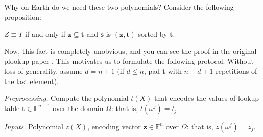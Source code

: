 Why on Earth do we need these two polynomials? Consider the following
proposition:

\begin{proposition}
    $Z \equiv T$ if and only if $\boldsymbol{z} \subseteq \boldsymbol{t}$ and
    $\boldsymbol{s}$ is $(\boldsymbol{z},\boldsymbol{t})$ sorted by
    $\boldsymbol{t}$.
\end{proposition}

Now, this fact is completely unobvious, and you can see the proof in the
original plookup paper \cite{plookup}. This
motivates us to formulate the following protocol. Without loss of generality,
assume $d=n+1$ (if $d \leq n$, pad $\boldsymbol{t}$ with $n-d+1$ repetitions of
the last element).

\textit{Preprocessing.} Compute the polynomial $t(X)$ that encodes the values of
lookup table $\boldsymbol{t} \in \mathbb{F}^{n+1}$ over the domain $\Omega$:
that is, $t(\omega^j)=t_j$. 

\textit{Inputs.} Polynomial $z(X)$, encoding vector $\boldsymbol{z} \in
\mathbb{F}^n$ over $\Omega$: that is, $z(\omega^j) = z_j$.

